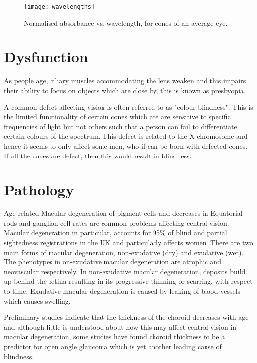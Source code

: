 \begin{figure}[!htbp]
 \centering
   \texttt{[image: wavelengths]}
 \caption{Normalised absorbance vs. wavelength, for cones of an average eye.\cite{wikicones}}
 \label{fig:wavelengths}
\end{figure}

\section{Dysfunction}

As people age, ciliary muscles accommodating the lens weaken and
this impairs their ability to focus on objects which are close by, this
is known as presbyopia.\cite{fisher1985ciliary}


A common defect affecting vision is often referred to as "colour blindness".
This is the limited functionality of certain cones which are are sensitive
to specific frequencies of light but not others such that a person can fail
to differentiate certain colours of the spectrum. This defect is related to
the X chromosome and hence it seems to only affect some men, who if can be
born with defected cones.\cite{george1996clinical} If all the cones are defect,
then this would result in blindness.

\section{Pathology}

Age related Macular degeneration of pigment cells and decreases in
Equatorial rods and ganglion cell rates are common problems affecting
central vision.\cite{gao1992aging} Macular degeneration in particular,
accounts for 95\% of blind and partial sightedness registrations in the
UK and particularly affects women.\cite{o1998age,klein2005complement}
There are two main forms of macular degeneration, non-exudative (dry)
and exudative (wet). The phenotypes in on-exudative macular degeneration
are atrophic and neovascular respectively.\cite{kuno2011dry} In
non-exudative macular degeneration, deposits build up behind the retina
resulting in its progressive thinning or scarring, with respect to time.
Exudative macular degeneration is caused by leaking of blood vessels
which causes swelling.

Preliminary studies indicate that the thickness of the choroid decreases
with age and although little is understood about how this may affect
central vision in macular degeneration, some studies have found
choroid thickness to be a predictor for open angle glaucoma which
is yet another leading cause of blindness.
\cite{margolis2009pilot,gordon2002ocular}


